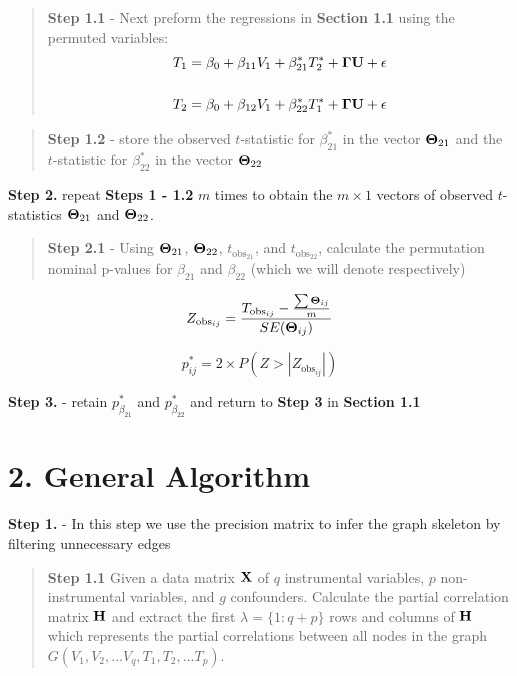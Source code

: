 \documentclass[12pt]{report}
\begin{document}
\begin{quote}
\textbf{Step 1.1} - Next preform the regressions in \textbf{Section 1.1} using the permuted variables:
\begin{eqnarray}
T_1 = \beta_0 +\beta_{11}V_1+\beta_{21}^{\ast}T_2^{\ast}+{\bf \Gamma U}+ \epsilon \\
\nonumber\\
T_2 = \beta_0 +\beta_{12}V_1+\beta_{22}^{\ast}T_1^{\ast}+{\bf \Gamma U}+ \epsilon 
\end{eqnarray}
\end{quote}

\begin{quote}
\textbf{Step 1.2} - store the observed $t$-statistic for $\beta_{21}^{\ast}$ in the vector ${\bf \Theta}_{21}$ and the $t$-statistic for $\beta_{22}^{\ast}$ in the vector ${\bf \Theta}_{22}$
\end{quote}

\noindent \textbf{Step 2.} repeat \textbf{Steps 1 - 1.2} $m$ times to obtain the $m \times 1$ vectors of observed $t$-statistics ${\bf \Theta}_{21}$ and ${\bf \Theta}_{22}$. \\

\begin{quote}
\textbf{Step 2.1} - Using ${\bf \Theta}_{21}$, ${\bf \Theta}_{22}$, $t_{\text{obs}_{21}}$, and $t_{\text{obs}_{22}}$, calculate the permutation nominal p-values for $\beta_{21}$ and $\beta_{22}$ (which we will denote  respectively)
\end{quote}

\[ Z_{\text{obs}_{ij}} = \frac{T_{\text{obs}_{ij}} - \frac{\sum {\bf \Theta}_{ij}}{m} }{SE({\bf \Theta}_{ij})} \]

\[ p^{\ast}_{ij} = 2\times P(Z >  |Z_{\text{obs}_{ij}}|) \]


\noindent \textbf{Step 3.} - retain $p_{\beta_{21}}^{\ast}$ and $p_{\beta_{22}}^{\ast}$ and return to \textbf{Step 3} in \textbf{Section 1.1} \\


\section*{2. General Algorithm}
\textbf{Step 1.} - In this step we use the precision matrix to infer the graph skeleton by filtering unnecessary edges 
\begin{quote}
 \textbf{Step 1.1} Given a data matrix ${\bf X}$ of $q$ instrumental variables, $p$ non-instrumental variables, and $g$ confounders. Calculate the partial correlation matrix $\bf H$ and extract the first $\lambda = \{1 : q+p\}$ rows and columns of ${\bf H}$ which represents the partial correlations between all nodes in the graph $G(V_1, V_2,...V_q, T_1, T_2, ... T_p)$.
\end{quote}
\end{document}
